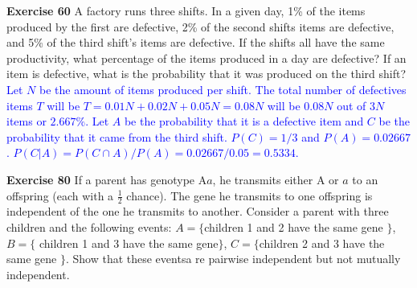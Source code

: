 \documentclass[10pt,a4paper]{report}
\newcommand{\BLUE}[1]{\textcolor{blue}{#1}}
\begin{document}
\noindent\textbf{Exercise 60} A factory runs three shifts.  In a given day, 1\% of the items produced by the first are defective, 2\% of the second shifts items are defective, and 5\% of the third shift's items are defective.  If the shifts all have the same productivity, what percentage of the items produced in a day are defective?  If an item is defective, what is the probability that it was produced on the third shift?\\

\BLUE{Let $N$ be the amount of items produced per shift.  The total number of defectives items $T$ will be $T = 0.01N+0.02N+0.05N = 0.08N$ will be $0.08N$ out of $3N$ items or $2.667\%$.  Let $A$ be the probability that it is a defective item and $C$ be the probability that it came from the third shift.  $P(C) = 1/3$ and $P(A) = 0.02667$.  $P(C|A) = P(C \cap A)/P(A) = 0.02667/0.05 = 0.5334$.\\
}

\noindent\textbf{Exercise 80}  If a parent has genotype A$a$, he transmits either A or $a$ to an offspring (each with a $\frac{1}{2}$ chance).  The gene he transmits to one offspring is independent of the one he transmits to another.  Consider a parent with three children and the following events:  $A = \{$children 1 and 2 have the same gene $\}$, $B=\{$ children 1 and 3 have the same gene$\}$, $C=\{$children 2 and 3 have the same gene $\}$.  Show that these eventsa re pairwise independent but not mutually independent.
\end{document}
